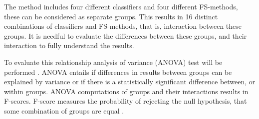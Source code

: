 The method includes four different classifiers and four different FS-methods, these can be considered as separate groups. This results in 16 distinct combinations of classifiers and FS-methods, that is, interaction between these groups. It is needful to evaluate the differences between these groups, and their interaction to fully understand the results.

To evaluate this relationship analysis of variance (ANOVA) test will be performed \parencite{sthle1989}. ANOVA entails if differences in results between groups can be explained by variance or if there is a statistically significant difference between, or within groups. ANOVA computations of groups and their interactions results in F-scores. F-score measures the probability of rejecting the null hypothesis, that some combination of groups are equal \parencite{sthle1989}.
